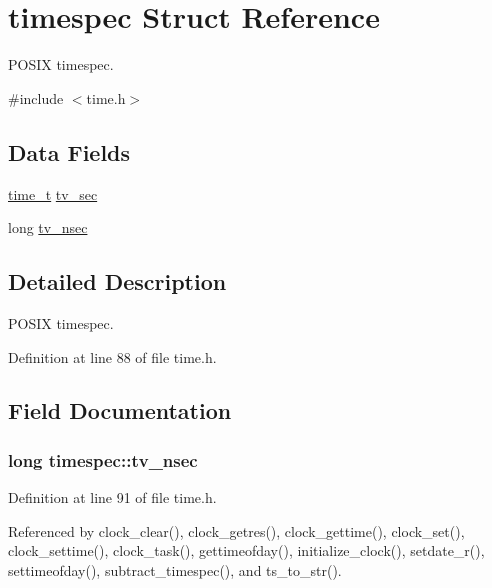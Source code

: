 \hypertarget{structtimespec}{}\section{timespec Struct Reference}
\label{structtimespec}


P\+O\+S\+IX timespec.  




{\ttfamily \#include $<$time.\+h$>$}

\subsection*{Data Fields}
\begin{DoxyCompactItemize}
\item 
\hyperlink{time_8h_a3346b04b0420b32ccf6b706551b70762}{time\+\_\+t} \hyperlink{structtimespec_afc3302668d7cb5952f590da69fdd4955}{tv\+\_\+sec}
\item 
long \hyperlink{structtimespec_ae3c7510dafa8cbcaede866ed13c99683}{tv\+\_\+nsec}
\end{DoxyCompactItemize}


\subsection{Detailed Description}
P\+O\+S\+IX timespec. 

Definition at line 88 of file time.\+h.



\subsection{Field Documentation}
\subsubsection[{\texorpdfstring{tv\+\_\+nsec}{tv_nsec}}]{\setlength{\rightskip}{0pt plus 5cm}long timespec\+::tv\+\_\+nsec}\hypertarget{structtimespec_ae3c7510dafa8cbcaede866ed13c99683}{}\label{structtimespec_ae3c7510dafa8cbcaede866ed13c99683}


Definition at line 91 of file time.\+h.



Referenced by clock\+\_\+clear(), clock\+\_\+getres(), clock\+\_\+gettime(), clock\+\_\+set(), clock\+\_\+settime(), clock\+\_\+task(), gettimeofday(), initialize\+\_\+clock(), setdate\+\_\+r(), settimeofday(), subtract\+\_\+timespec(), and ts\+\_\+to\+\_\+str().

